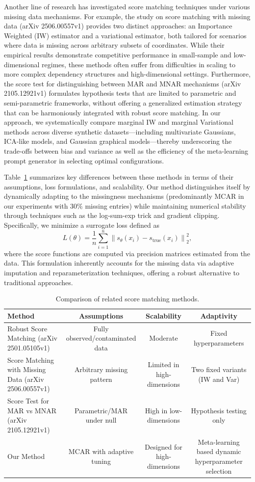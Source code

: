 \documentclass{article}
\begin{document}
Another line of research has investigated score matching techniques under various missing data mechanisms. For example, the study on score matching with missing data (arXiv 2506.00557v1) provides two distinct approaches: an Importance Weighted (IW) estimator and a variational estimator, both tailored for scenarios where data is missing across arbitrary subsets of coordinates. While their empirical results demonstrate competitive performance in small-sample and low-dimensional regimes, these methods often suffer from difficulties in scaling to more complex dependency structures and high-dimensional settings. Furthermore, the score test for distinguishing between MAR and MNAR mechanisms (arXiv 2105.12921v1) formulates hypothesis tests that are limited to parametric and semi-parametric frameworks, without offering a generalized estimation strategy that can be harmoniously integrated with robust score matching. In our approach, we systematically compare marginal IW and marginal Variational methods across diverse synthetic datasets—including multivariate Gaussians, ICA-like models, and Gaussian graphical models—thereby underscoring the trade-offs between bias and variance as well as the efficiency of the meta-learning prompt generator in selecting optimal configurations.

Table~\ref{tab:comparison} summarizes key differences between these methods in terms of their assumptions, loss formulations, and scalability. Our method distinguishes itself by dynamically adapting to the missingness mechanisms (predominantly MCAR in our experiments with 30\% missing entries) while maintaining numerical stability through techniques such as the log-sum-exp trick and gradient clipping. Specifically, we minimize a surrogate loss defined as
\[
L(\theta) = \frac{1}{n} \sum_{i=1}^n \left\| s_\theta(x_i) - s_{\mathrm{true}}(x_i) \right\|_2^2,
\]
where the score functions are computed via precision matrices estimated from the data. This formulation inherently accounts for the missing data via adaptive imputation and reparameterization techniques, offering a robust alternative to traditional approaches.

\begin{table}[h]
\centering
\begin{tabular}{lccc}
\hline
Method & Assumptions & Scalability & Adaptivity \\
\hline
Robust Score Matching (arXiv 2501.05105v1) & Fully observed/contaminated data & Moderate & Fixed hyperparameters \\
Score Matching with Missing Data (arXiv 2506.00557v1) & Arbitrary missing pattern & Limited in high-dimensions & Two fixed variants (IW and Var) \\
Score Test for MAR vs MNAR (arXiv 2105.12921v1) & Parametric/MAR under null & High in low-dimensions & Hypothesis testing only \\
Our Method & MCAR with adaptive tuning & Designed for high-dimensions & Meta-learning based dynamic hyperparameter selection \\
\hline
\end{tabular}
\caption{Comparison of related score matching methods.}
\label{tab:comparison}
\end{table}
\end{document}
